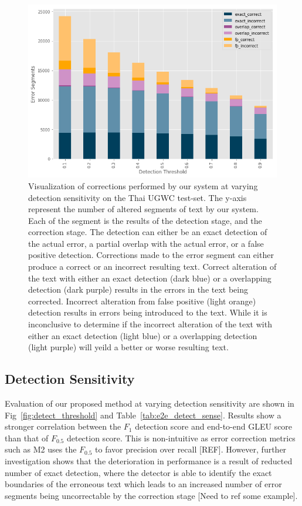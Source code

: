 \begin{figure}
    \centering
    \label{fig:thresholding_prediction}
    \includegraphics[width=12.5cm]{diagrams/thresholding-prediction.png}
    \caption{Visualization of corrections performed by our system at varying detection sensitivity on the Thai UGWC test-set. The y-axis represent the number of altered segments of text by our system. Each of the segment is the results of the detection stage, and the correction stage. The detection can either be an exact detection of the actual error, a partial overlap with the actual error, or a false positive detection. Corrections made to the error segment can either produce a correct or an incorrect resulting text. Correct alteration of the text with either an exact detection (dark blue) or a overlapping detection (dark purple) results in the errors in the text being corrected. Incorrect alteration from false positive (light orange) detection results in errors being introduced to the text. While it is inconclusive to determine if the incorrect alteration of the text with either an exact detection (light blue) or a overlapping detection (light purple) will yeild a better or worse resulting text.}
\end{figure}

\subsection*{Detection Sensitivity}
Evaluation of our proposed method at varying detection sensitivity are shown in Fig~\ref{fig:detect_threshold} and Table~\ref{tab:e2e_detect_sense}. Results show a stronger correlation between the $F_1$ detection score and end-to-end GLEU score than that of $F_{0.5}$ detection score. This is non-intuitive as error correction metrics such as M2 uses the $F_{0.5}$ to favor precision over recall [REF]. However, further investigation shows that the deterioration in performance is a result of reducted number of exact detection, where the detector is able to identify the exact boundaries of the erroneous text which leads to an increased number of error segments being uncorrectable by the correction stage [Need to ref some example].

